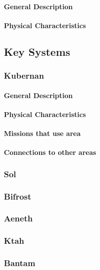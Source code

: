\paragraph{General Description}
\paragraph{Physical Characteristics}

\subsection{Key Systems}

\subsubsection{Kubernan}
\paragraph{General Description}
\paragraph{Physical Characteristics}
\paragraph{Missions that use area}
\paragraph{Connections to other areas}

\subsubsection{Sol}
\subsubsection{Bifrost}
\subsubsection{Aeneth}
\subsubsection{Ktah}
\subsubsection{Bantam}

